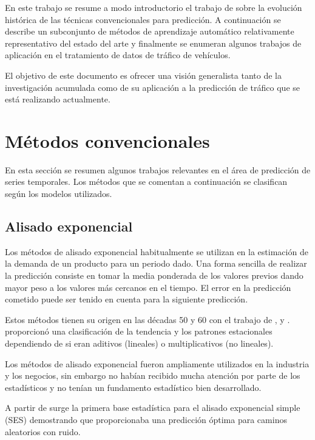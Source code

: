 \documentclass{llncs}
\begin{document}
En este trabajo se resume a modo introductorio el trabajo de \cite{DeGooijer2006443} sobre la evolución histórica de las técnicas convencionales para predicción. A continuación se describe un subconjunto de métodos de aprendizaje automático relativamente representativo del estado del arte y finalmente se enumeran algunos trabajos de aplicación en el tratamiento de datos de tráfico de vehículos.

El objetivo de este documento es ofrecer una visión generalista tanto de la investigación acumulada como de su aplicación a la predicción de tráfico que se está realizando actualmente.

\section{Métodos convencionales}

En esta sección se resumen algunos trabajos relevantes en el área de predicción de series temporales. Los métodos que se comentan a continuación se clasifican según los modelos utilizados. 

\subsection{Alisado exponencial}

Los métodos de alisado exponencial habitualmente se utilizan en la estimación de la demanda de un producto para un periodo dado. Una forma sencilla de realizar la predicción consiste en tomar la media ponderada de los valores previos dando mayor peso a los valores más cercanos en el tiempo. El error en la predicción cometido puede ser tenido en cuenta para la siguiente predicción.

Estos métodos tienen su origen en las décadas 50 y 60 con el trabajo de \cite{Brown1959}, \cite{Holt20045} y \cite{Winters1960324}. \cite{Pegels1969311} proporcionó una clasificación de la tendencia y los patrones estacionales dependiendo de si eran aditivos (lineales)  o multiplicativos (no lineales).

Los métodos de alisado exponencial fueron ampliamente utilizados en la industria y los negocios, sin embargo no habían recibido mucha atención por parte de los estadísticos y no tenían un fundamento estadístico bien desarrollado. 

A partir de \cite{Muth1960299} surge la primera base estadística para el alisado exponencial simple (SES) demostrando que proporcionaba una predicción óptima para caminos aleatorios con ruido. 
\end{document}

